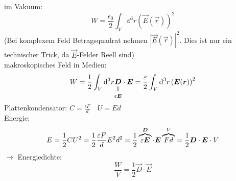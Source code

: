 im Vakuum:
\begin{equation*}
W = \frac{\epsilon_0}{2} \int_V \dd^3r \left(\vec{E}(\vec{r})\right)^2
\end{equation*}
(Bei komplexem Feld Betragsquadrat nehmen $ |\vec{E}(\vec{r})|^2 $. Dies ist nur ein technischer Trick, da $ \vec{E} $-Felder Reell sind)\\[5pt]
makroskopisches Feld in Medien:
\begin{equation*}
W = \frac{1}{2} \int_V \dd^3r \equalto{\vec{D}}{\epsilon \vec{E}} \cdot \vec{E} = \frac{\epsilon}{2} \int_V \dd^3 r \left(\vec{E}(\vec{r})\right)^2
\end{equation*}
Plattenkondensator: $ C = \frac{\epsilon F}{d} \quad U = E d $\\
Energie:
$$ E = \frac{1}{2} CU^2 = \frac{1}{2} \frac{\varepsilon F}{d} E^2 d^2 = \frac{1}{2} \overbrace{\varepsilon \bm{E}}^{\bm{D}} \cdot \bm{E} \overbrace{F d}^{V} = \frac{1}{2} \bm{D} \cdot \bm{E} \cdot V $$
$ \rightarrow $ Energiedichte:
\begin{equation*}
\frac{W}{V} = \frac{1}{2} \vec{D} \cdot \vec{E}
\end{equation*}
